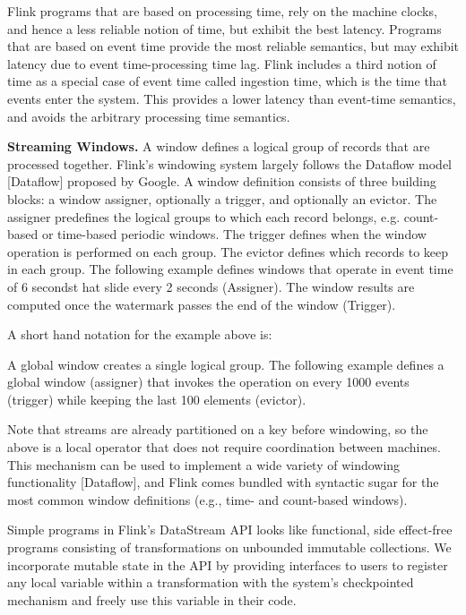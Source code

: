 \documentclass{sig-alternate}
\begin{document}
Flink programs that are based on processing time, rely on the machine clocks, and hence a less reliable notion of time, but exhibit the best latency. Programs that are based on event time provide the most reliable semantics, but may exhibit latency due to event time-processing time lag. Flink includes a third notion of time as a special case of event time called ingestion time, which is the time that events enter the system. This provides  a lower latency than event-time semantics, and avoids the arbitrary processing time semantics.

\textbf{Streaming Windows.} A window defines a logical group of records that are processed together. Flink's windowing system largely follows the Dataflow model [Dataflow] proposed by Google. A window definition consists of three building blocks: a window assigner, optionally a trigger, and optionally an evictor. 
The assigner predefines the logical groups to which each record belongs, e.g. count-based or time-based periodic windows. The trigger defines when the window operation is performed on each group. The evictor defines which records to keep in each group. The following example defines windows that operate in event time of 6 secondst hat slide every 2 seconds (Assigner). The window results are computed once the watermark passes the end of the window (Trigger).


A short hand notation for the example above is:


A global window creates a single logical group. The following example defines a global window (assigner) that invokes the operation on every 1000 events (trigger) while keeping the last 100 elements (evictor). 


Note that streams are already partitioned on a key before windowing, so the above is a local operator that does not require coordination between machines. This mechanism can be used to implement a wide variety of windowing functionality [Dataflow], and Flink comes bundled with syntactic sugar for the most common window definitions (e.g., time- and count-based windows). 

Simple programs in Flink's DataStream API looks like functional, side effect-free programs consisting of transformations on unbounded immutable collections. We incorporate mutable state in the API by providing interfaces to users to register any local variable within a transformation with the system's checkpointed mechanism and freely use this variable in their code. 
\end{document}
